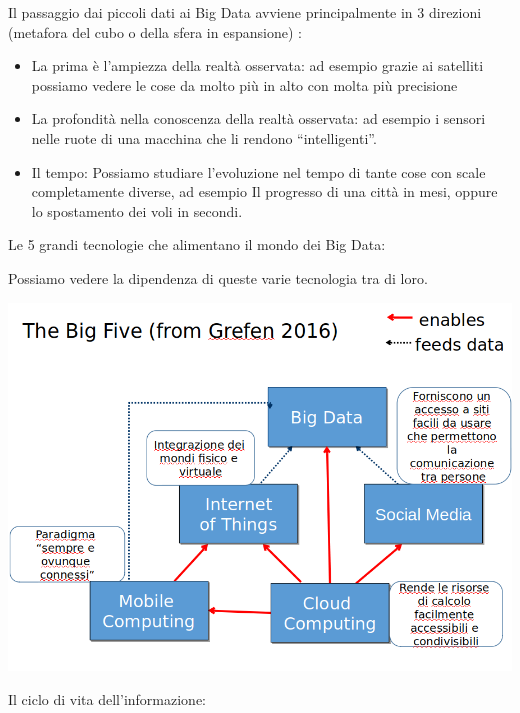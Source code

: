\documentclass[a4page, 11pt]{article}
\begin{document}
Il passaggio dai piccoli dati ai Big Data avviene principalmente in 3
direzioni (metafora del cubo o della sfera in espansione) :

\begin{itemize}
	 
	\item
	La prima è l'ampiezza della realtà osservata: ad esempio grazie ai
	satelliti possiamo vedere le cose da molto più in alto con molta più
	precisione
	\item
	La profondità nella conoscenza della realtà osservata: ad esempio i
	sensori nelle ruote di una macchina che li rendono ``intelligenti''.
	\item
	Il tempo: Possiamo studiare l'evoluzione nel tempo di tante cose con
	scale completamente diverse, ad esempio Il progresso di una città in
	mesi, oppure lo spostamento dei voli in secondi.
\end{itemize}

Le 5 grandi tecnologie che alimentano il mondo dei Big Data:

Possiamo vedere la dipendenza di queste varie tecnologia tra di loro.
\begin{center}
	\includegraphics[scale=0.4]{image7.png}
\end{center}

Il ciclo di vita dell'informazione:
\end{document}
